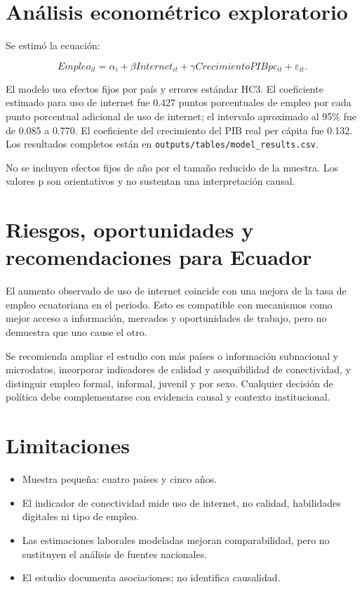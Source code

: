 \documentclass[
  spanish,
  letterpaper,
  DIV=11,
  numbers=noendperiod]{scrartcl}
\providecommand{\tightlist}{%
  \setlength{\itemsep}{0pt}\setlength{\parskip}{0pt}}
\begin{document}
\section{Análisis econométrico
exploratorio}\label{anuxe1lisis-economuxe9trico-exploratorio}

Se estimó la ecuación:

\[Empleo_{it}=\alpha_i+\beta Internet_{it}+\gamma CrecimientoPIBpc_{it}+\varepsilon_{it}.\]

El modelo usa efectos fijos por país y errores estándar HC3. El
coeficiente estimado para uso de internet fue 0.427 puntos porcentuales
de empleo por cada punto porcentual adicional de uso de internet; el
intervalo aproximado al 95\% fue de 0.085 a 0.770. El coeficiente del
crecimiento del PIB real per cápita fue 0.132. Los resultados completos
están en \texttt{outputs/tables/model\_results.csv}.

No se incluyen efectos fijos de año por el tamaño reducido de la
muestra. Los valores p son orientativos y no sustentan una
interpretación causal.

\section{Riesgos, oportunidades y recomendaciones para
Ecuador}\label{riesgos-oportunidades-y-recomendaciones-para-ecuador}

El aumento observado de uso de internet coincide con una mejora de la
tasa de empleo ecuatoriana en el periodo. Esto es compatible con
mecanismos como mejor acceso a información, mercados y oportunidades de
trabajo, pero no demuestra que uno cause el otro.

Se recomienda ampliar el estudio con más países o información
subnacional y microdatos, incorporar indicadores de calidad y
asequibilidad de conectividad, y distinguir empleo formal, informal,
juvenil y por sexo. Cualquier decisión de política debe complementarse
con evidencia causal y contexto institucional.

\section{Limitaciones}\label{limitaciones}

\begin{itemize}
\tightlist
\item
  Muestra pequeña: cuatro países y cinco años.
\item
  El indicador de conectividad mide uso de internet, no calidad,
  habilidades digitales ni tipo de empleo.
\item
  Las estimaciones laborales modeladas mejoran comparabilidad, pero no
  sustituyen el análisis de fuentes nacionales.
\item
  El estudio documenta asociaciones; no identifica causalidad.
\end{itemize}
\end{document}
